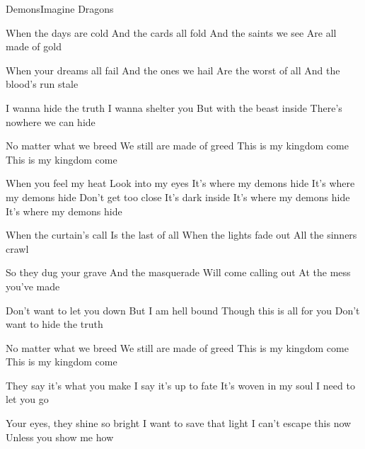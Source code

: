 \documentclass[a4paper,11pt,french]{article}
\begin{document}
\begin{Song}{Demons}{Imagine Dragons}
\begin{multicols}{2}
\begin{Verse}
When the days are cold
And the cards all fold
And the saints we see
Are all made of gold
\espaceInterStrophe

When your dreams all fail
And the ones we hail
Are the worst of all
And the blood’s run stale
\espaceInterStrophe

I wanna hide the truth
I wanna shelter you
But with the beast inside
There’s nowhere we can hide
\end{Verse}
\espaceInterStrophe

\begin{PreChorus}
No matter what we breed
We still are made of greed
This is my kingdom come
This is my kingdom come
\end{PreChorus}
\espaceInterStrophe

\begin{Chorus}
When you feel my heat
Look into my eyes
It’s where my demons hide
It’s where my demons hide
Don’t get too close
It’s dark inside
It’s where my demons hide
It’s where my demons hide
\end{Chorus}
\vfill
\columnbreak

\begin{Verse}
When the curtain’s call
Is the last of all
When the lights fade out
All the sinners crawl
\espaceInterStrophe

So they dug your grave
And the masquerade
Will come calling out
At the mess you've made
\espaceInterStrophe

Don’t want to let you down
But I am hell bound
Though this is all for you
Don’t want to hide the truth
\end{Verse}
\espaceInterStrophe

\begin{PreChorus}
No matter what we breed
We still are made of greed
This is my kingdom come
This is my kingdom come
\end{PreChorus}
\espaceInterStrophe

\tochorus
\espaceInterStrophe

\begin{Bridge}
They say it's what you make
I say it's up to fate
It's woven in my soul
I need to let you go
\espaceInterStrophe

Your eyes, they shine so bright
I want to save that light
I can't escape this now
Unless you show me how
\end{Bridge}
\espaceInterStrophe


\end{multicols}
\end{Song}
\end{document}
